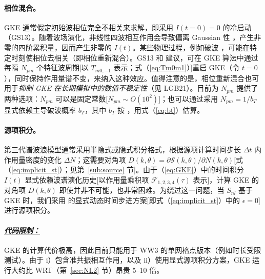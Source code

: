 \paragraph{相位混合。} GKE 通常假定初始波相位完全不相关来求解，即采用 $I(t=0) = 0$ 的冷启动（GS13）。随着波场演化，非线性四波相互作用会导致偏离 Gaussian 性 \citep{Janssen2003}，产生非零的四阶累积量，因而产生非零的 $I(t)$。某些物理过程，例如破波 \citep[如][]{bk:Bab11}，可能在特定时刻使相位去相关（即相位重新混合）。GS13 和 \citet{Gramstad2016} 建议，可在 GKE 算法中通过每隔 $N_{pm}$ 个特征波周期[以 $T_{m0, -1}$ 表示；式（\ref{eq:Tm0m1}）]重启 GKE（令 $t=0$），同时保持作用量谱不变，来纳入这种效应。值得注意的是，相位重新混合也可用于\emph{抑制 GKE 在长期模拟中的数值不稳定性}（见 LGB21）。目前为 $N_{pm}$ 提供了两种选项：$N_{pm}$ 可以是固定常数[$N_{pm} \sim \textit{O} (10^2)$]；也可以通过采用 $N_{pm} = 1 / b_T$ 显式依赖主导破波概率 $b_T$，其中 $b_T$ 按 \citet{art:BBY01}，用式（\ref{eq:bt}）估算。

\paragraph{源项积分。} 第三代谱波浪模型通常采用半隐式或隐式积分格式，根据源项计算时间步长 $\Delta t$ 内作用量密度的变化 $\Delta N$；这需要对角项 $D(k, \theta) = \partial \mathcal{S} (k, \theta) / \partial N(k, \theta)$[式（\ref{eq:implicit_st}）；见第~\ref{sub:source} 节]。由于（\ref{eq:GKE}）中的时间积分 $I(t)$ 显式依赖波谱演化历史[以作用量乘积项 $\mathcal{F}_{1,2,3,4} (\tau)$ 表示]，计算 GKE 的对角项 $D(k, \theta)$ 即使并非不可能，也非常困难。为绕过这一问题，当 $S_{nl}$ 基于 GKE 时，我们采用 \citet{tol:JPO92} 的显式动态时间步进方案[即式（\ref{eq:implicit_st}）中的 $\epsilon = 0$]进行源项积分。

\paragraph{\textit{\underline{代码限制：}}} GKE 的计算代价极高，因此目前只能用于 WW3 的单网格点版本（例如时长受限测试）。由于 i）包含准共振相互作用，以及 ii）使用显式源项积分方案，GKE 运行大约比 WRT（第~\ref{sec:NL2} 节）昂贵 5--10 倍。
